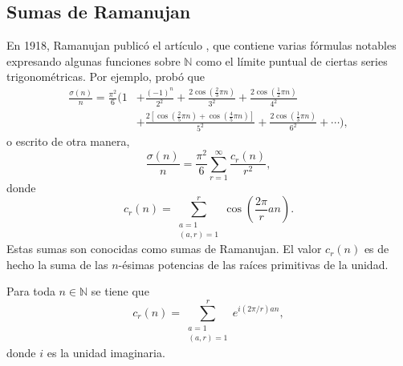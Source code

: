 \subsection{Sumas de Ramanujan}

En 1918, Ramanujan publicó el artículo \cite{Ram1}, que contiene varias fórmulas notables expresando algunas funciones sobre $\mathbb{N}$ como el límite puntual de ciertas series trigonométricas. Por ejemplo, probó que
\begin{align*}
    \frac{\sigma(n)}{n} = \frac{\pi^2}{6} \bigg( 1 & + \frac{(-1)^n}{2^2} + \frac{2 \cos \left( \frac{2}{3} \pi n \right)}{3^2} + \frac{2 \cos \left( \frac{1}{2} \pi n \right)}{4^2} \\
                                                   & + \frac{2 \left[ \cos \left( \frac{2}{5}\pi n \right) + \cos \left( \frac{4}{5} \pi n \right) \right]}{5^2} + \frac{2 \cos \left(  \frac{1}{3} \pi n \right)}{6^2} + \cdots \bigg),
\end{align*}
o escrito de otra manera,
\begin{equation*}
    \frac{\sigma(n)}{n} = \frac{\pi^2}{6} \sum_{r=1}^{\infty} \frac{c_r(n)}{r^2},
\end{equation*}
donde
\begin{equation*}
    c_r(n) = \sum_{\substack{a=1 \\ (a,r)=1}}^{r} \cos \left( \frac{2 \pi}{r} a n \right).
\end{equation*}
Estas sumas son conocidas como \textrm{sumas de Ramanujan}. El valor $c_r(n)$ es de hecho la suma de las $n$-ésimas potencias de las raíces primitivas de la unidad.

\thispagestyle{easter1}
\begin{proposition}
Para toda $n \in \mathbb{N}$ se tiene que
\begin{equation*}
    c_r(n) = \sum_{\substack{a=1 \\ (a,r)=1}}^{r} e^{i(2 \pi /r) a n},
\end{equation*}
donde $i$ es la unidad imaginaria.
\end{proposition}

